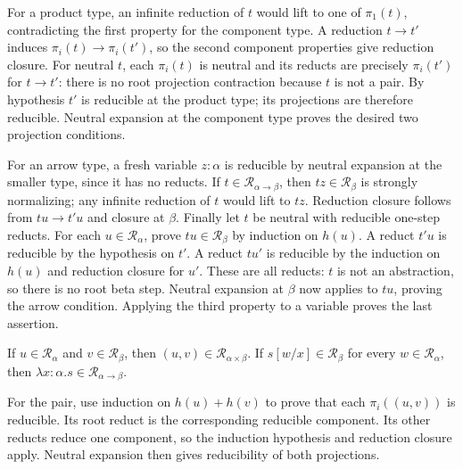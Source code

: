 For a product type, an infinite reduction of $t$ would lift to one of
$\pi_1(t)$, contradicting the first property for the component type.
A reduction $t\to t'$ induces $\pi_i(t)\to\pi_i(t')$, so the second
component properties give reduction closure. For neutral $t$, each
$\pi_i(t)$ is neutral and its reducts are precisely $\pi_i(t')$ for
$t\to t'$: there is no root projection contraction because $t$ is not
a pair. By hypothesis $t'$ is reducible at the product type; its
projections are therefore reducible. Neutral expansion at the component
type proves the desired two projection conditions.

For an arrow type, a fresh variable $z:\alpha$ is reducible by neutral
expansion at the smaller type, since it has no reducts. If
$t\in\mathcal R_{\alpha\to\beta}$, then $tz\in\mathcal R_\beta$
is strongly normalizing; any infinite reduction of $t$ would lift to
$tz$. Reduction closure follows from $tu\to t'u$ and closure at
$\beta$. Finally let $t$ be neutral with reducible one-step reducts.
For each $u\in\mathcal R_\alpha$, prove $tu\in\mathcal R_\beta$
by induction on $h(u)$. A reduct $t'u$ is reducible by the hypothesis
on $t'$. A reduct $tu'$ is reducible by the induction on $h(u)$ and
reduction closure for $u'$. These are all reducts: $t$ is not an
abstraction, so there is no root beta step. Neutral expansion at
$\beta$ now applies to $tu$, proving the arrow condition. Applying
the third property to a variable proves the last assertion.
\Done

\begin{lemma}
If $u\in\mathcal R_\alpha$ and $v\in\mathcal R_\beta$, then
$(u,v)\in\mathcal R_{\alpha\times\beta}$. If
$s[w/x]\in\mathcal R_\beta$ for every $w\in\mathcal R_\alpha$,
then $\lambda x:\alpha.s\in\mathcal R_{\alpha\to\beta}$.
\end{lemma}
\Proof
For the pair, use induction on $h(u)+h(v)$ to prove that each
$\pi_i((u,v))$ is reducible. Its root reduct is the corresponding
reducible component. Its other reducts reduce one component, so the
induction hypothesis and reduction closure apply. Neutral expansion
then gives reducibility of both projections.

